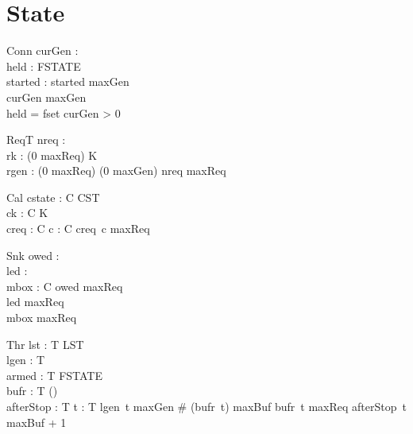 \documentclass[a4paper,10pt,fleqn]{article}
\begin{document}
\section{State}

\begin{schema}{Conn}
  curGen : \nat \\
  held : FSTATE \\
  started : \power \nat
\where
  started  \upto maxGen \\
  curGen \leq maxGen \\
  held = fset \implies curGen > 0
\end{schema}

\begin{schema}{ReqT}
  nreq : \nat \\
  rk : (0 \upto maxReq) \fun K \\
  rgen : (0 \upto maxReq) \fun (0 \upto maxGen)
\where
  nreq \leq maxReq
\end{schema}

\begin{schema}{Cal}
  cstate : C \fun CST \\
  ck : C \fun K \\
  creq : C \fun \nat
\where
  \forall c : C \spot creq~c \leq maxReq
\end{schema}

\begin{schema}{Snk}
  owed : \power \nat \\
  led : \power \nat \\
  mbox : C \pfun \nat
\where
  owed  \upto maxReq \\
  led  \upto maxReq \\
  \ran mbox  \upto maxReq
\end{schema}

\begin{schema}{Thr}
  lst : T \fun LST \\
  lgen : T \fun \nat \\
  armed : T \fun FSTATE \\
  bufr : T \fun (\power \nat) \\
  afterStop : T \fun \nat
\where
  \forall t : T \spot lgen~t \leq maxGen \land \# (bufr~t) \leq maxBuf
    \land bufr~t  \upto maxReq \land afterStop~t \leq maxBuf + 1
\end{schema}
\end{document}
